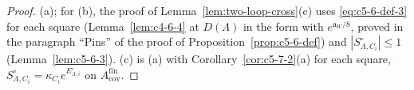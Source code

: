 \begin{proof}
(a); for (b), the proof of Lemma~\ref{lem:two-loop-cross}(c) uses \eqref{eq:c5-6-def-3} for each square (Lemma~\ref{lem:c4-6-4} at $D(\Lambda)$ in the form with $e^{\mathfrak a_W/8}$, proved in the paragraph ``Pins'' of the proof of Proposition~\ref{prop:c5-6-def}) and $|S^\circ_{\Lambda,C_i}|\leq1$ (Lemma~\ref{lem:c5-6-3}). (c) is (a) with Corollary~\ref{cor:c5-7-2}(a) for each square, $S^\circ_{\Lambda,C_i}=\kappa_{C_i}e^{E^\circ_{\Lambda,i}}$ on $A^{\mathrm{fin}}_{\mathrm{cov}}$.
\end{proof}
